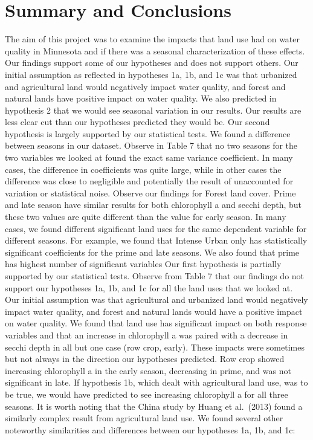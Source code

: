 \documentclass[12pt,]{article}
\begin{document}
\newpage

\hypertarget{summary-and-conclusions}{%
\section{Summary and Conclusions}\label{summary-and-conclusions}}

The aim of this project was to examine the impacts that land use had on
water quality in Minnesota and if there was a seasonal characterization
of these effects. Our findings support some of our hypotheses and does
not support others. Our initial assumption as reflected in hypotheses
1a, 1b, and 1c was that urbanized and agricultural land would negatively
impact water quality, and forest and natural lands have positive impact
on water quality. We also predicted in hypothesis 2 that we would see
seasonal variation in our results. Our results are less clear cut than
our hypotheses predicted they would be. Our second hypothesis is largely
supported by our statistical tests. We found a difference between
seasons in our dataset. Observe in Table 7 that no two seasons for the
two variables we looked at found the exact same variance coefficient. In
many cases, the difference in coefficients was quite large, while in
other cases the difference was close to negligible and potentially the
result of unaccounted for variation or statistical noise. Observe our
findings for Forest land cover. Prime and late season have similar
results for both chlorophyll a and secchi depth, but these two values
are quite different than the value for early season. In many cases, we
found different significant land uses for the same dependent variable
for different seasons. For example, we found that Intense Urban only has
statistically significant coefficients for the prime and late seasons.
We also found that prime has highest number of significant variables Our
first hypothesis is partially supported by our statistical tests.
Observe from Table 7 that our findings do not support our hypotheses 1a,
1b, and 1c for all the land uses that we looked at. Our initial
assumption was that agricultural and urbanized land would negatively
impact water quality, and forest and natural lands would have a positive
impact on water quality. We found that land use has significant impact
on both response variables and that an increase in chlorophyll a was
paired with a decrease in secchi depth in all but one case (row crop,
early). These impacts were sometimes but not always in the direction our
hypotheses predicted. Row crop showed increasing chlorophyll a in the
early season, decreasing in prime, and was not significant in late. If
hypothesis 1b, which dealt with agricultural land use, was to be true,
we would have predicted to see increasing chlorophyll a for all three
seasons. It is worth noting that the China study by Huang et al.~(2013)
found a similarly complex result from agricultural land use. We found
several other noteworthy similarities and differences between our
hypotheses 1a, 1b, and 1c:
\end{document}
